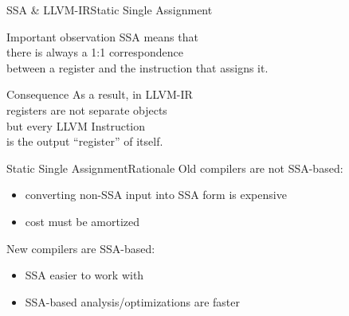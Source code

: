 \begin{frame}{SSA \& LLVM-IR}{Static Single Assignment}
\large
\begin{block}{\centering Important observation}
\centering
SSA means that\\
\alert{there is always a 1:1 correspondence}\\
\alert{between a register and the instruction that assigns it}.
\end{block}
\bigskip
\begin{block}{\centering Consequence}
\centering
As a result, in LLVM-IR\\
\alert{registers are not separate objects}\\
but \alert{every LLVM Instruction\\is the output ``register'' of itself}.
\end{block}
\end{frame}


\begin{frame}{Static Single Assignment}{Rationale}
Old compilers are not SSA-based:

\begin{itemize}
\item converting non-SSA input into SSA form is expensive
\item cost must be amortized
\end{itemize}

\vfill
New compilers are SSA-based:

\begin{itemize}
\item SSA easier to work with
\item SSA-based analysis/optimizations are faster
\end{itemize}

%
\end{frame}


